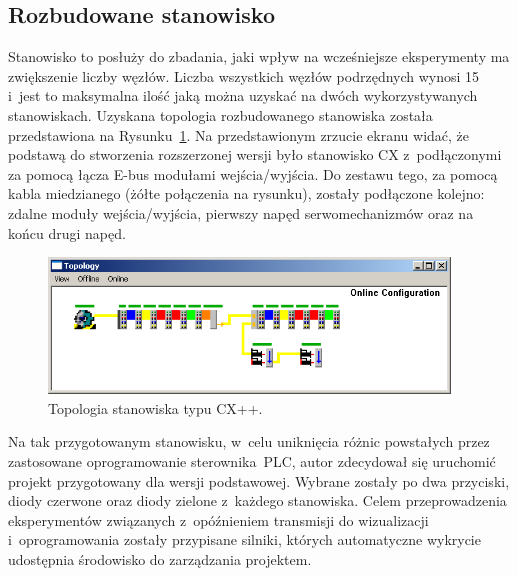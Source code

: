 \subsection{Rozbudowane stanowisko}
Stanowisko to posłuży do zbadania, jaki wpływ na wcześniejsze eksperymenty ma zwiększenie liczby węzłów. Liczba wszystkich węzłów podrzędnych wynosi 15 i~jest to maksymalna ilość jaką można uzyskać na dwóch wykorzystywanych stanowiskach. Uzyskana topologia rozbudowanego stanowiska została przedstawiona na Rysunku~\ref{topology:cx++}.
Na przedstawionym zrzucie ekranu widać, że podstawą do stworzenia rozszerzonej wersji było stanowisko CX z~podłączonymi za pomocą łącza E-bus modułami wejścia/wyjścia. Do zestawu tego, za pomocą kabla miedzianego (żółte połączenia na rysunku), zostały podłączone kolejno: zdalne moduły wejścia/wyjścia, pierwszy napęd serwomechanizmów oraz na końcu drugi napęd.

\begin{figure}[!htb] 	\centering 	\includegraphics[width=0.95\textwidth]{images/topologyCX++} \caption{Topologia stanowiska typu CX++.} \label{topology:cx++} \end{figure}

Na tak przygotowanym stanowisku, w~celu uniknięcia różnic powstałych przez zastosowane oprogramowanie sterownika~PLC, autor zdecydował się uruchomić projekt przygotowany dla wersji podstawowej. Wybrane zostały po dwa przyciski, diody czerwone oraz diody zielone z~każdego stanowiska. Celem przeprowadzenia eksperymentów związanych z~opóźnieniem transmisji do wizualizacji i~oprogramowania zostały przypisane silniki, których automatyczne wykrycie udostępnia środowisko do zarządzania projektem.
%
%

%
%
%

